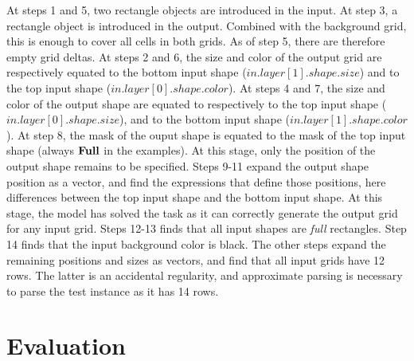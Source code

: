 \documentclass[a4paper]{llncs}
\begin{document}
At steps 1 and 5, two rectangle objects are introduced in the input.
At step 3, a rectangle object is introduced in the output. Combined
with the background grid, this is enough to cover all cells in both
grids. As of step 5, there are therefore empty grid deltas.
%
At steps 2 and 6, the size and color of the output grid are
respectively equated to the bottom input shape
($in.layer[1].shape.size$) and to the top input shape
($in.layer[0].shape.color$). At steps 4 and 7, the size and color of
the output shape are equated to respectively to the top input shape
($in.layer[0].shape.size$), and to the bottom input shape
($in.layer[1].shape.color$). At step 8, the mask of the ouput shape is
equated to the mask of the top input shape (always ${\bf Full}$ in the
examples). At this stage, only the position of the output shape remains
to be specified.
%
Steps 9-11 expand the output shape position as a vector, and find the
expressions that define those positions, here differences between the
top input shape and the bottom input shape.
%
At this stage, the model has solved the task as it can correctly
generate the output grid for any input grid.
%
Steps 12-13 finds that all input shapes are {\em full}
rectangles. Step 14 finds that the input background color is black.
%
The other steps expand the remaining positions and sizes as vectors,
and find that all input grids have 12 rows. The latter is an
accidental regularity, and approximate parsing is necessary to parse
the test instance as it has 14 rows.


\section{Evaluation}
\label{eval}
\end{document}
